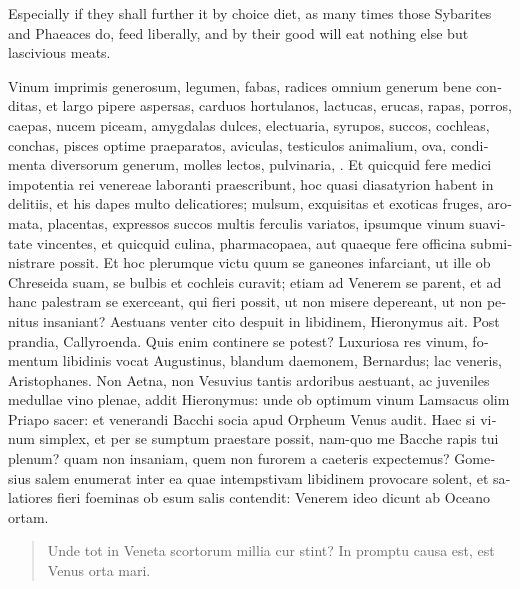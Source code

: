 Especially if they shall further it by choice diet, as many times those
Sybarites and Phaeaces do, feed liberally, and by their good will eat
nothing else but lascivious meats.

\begin{latin}
Vinum imprimis generosum,
legumen, fabas, radices omnium generum bene conditas, et largo pipere
aspersas, carduos hortulanos, lactucas, erucas, rapas, porros,
caepas, nucem piceam, amygdalas dulces, electuaria, syrupos, succos,
cochleas, conchas, pisces optime praeparatos, aviculas, testiculos
animalium, ova, condimenta diversorum generum, molles lectos,
pulvinaria, \etc{}. Et quicquid fere medici impotentia rei venereae
laboranti praescribunt, hoc quasi diasatyrion habent in delitiis, et
his dapes multo delicatiores; mulsum, exquisitas et exoticas fruges,
aromata, placentas, expressos succos multis ferculis variatos, ipsumque
vinum suavitate vincentes, et quicquid culina, pharmacopaea, aut
quaeque fere officina subministrare possit. Et hoc plerumque victu quum
se ganeones infarciant, ut ille ob Chreseida suam, se bulbis et
cochleis curavit; etiam ad Venerem se parent, et ad hanc palestram se
exerceant, qui fieri possit, ut non misere depereant, ut non
penitus insaniant? Aestuans venter cito despuit in libidinem,
Hieronymus ait. Post prandia, Callyroenda. Quis enim continere se
potest? Luxuriosa res vinum, fomentum libidinis vocat Augustinus,
blandum daemonem, Bernardus; lac veneris, Aristophanes. Non Aetna, non
Vesuvius tantis ardoribus aestuant, ac juveniles medullae vino plenae,
addit Hieronymus: unde ob optimum vinum Lamsacus olim Priapo
sacer: et venerandi Bacchi socia apud  Orpheum Venus audit. Haec
si vinum simplex, et per se sumptum praestare possit, nam-quo me
Bacche rapis tui plenum? quam non insaniam, quem non furorem a caeteris
expectemus? Gomesius salem enumerat inter ea quae intempstivam
libidinem provocare solent, et salatiores fieri foeminas ob esum salis
contendit: Venerem ideo dicunt ab Oceano ortam.
\end{latin}

\begin{latin}
\begin{verse}%
Unde tot in Veneta scortorum millia cur stint?
In promptu causa est, est Venus orta mari.
\end{verse}%
\end{latin}

